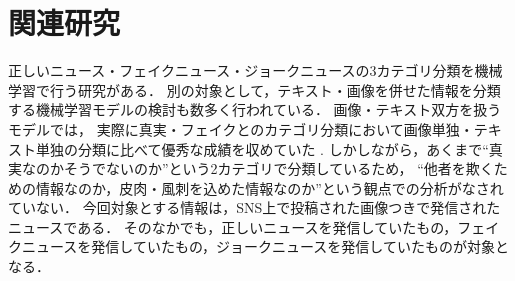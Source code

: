 \section{関連研究}\label{ch:related}
正しいニュース・フェイクニュース・ジョークニュースの3カテゴリ分類を機械学習で行う研究がある\cite{DBLP:journals/corr/HorneA17}．
別の対象として，テキスト・画像を併せた情報を分類する機械学習モデルの検討も数多く行われている\cite{Wang:2018:EEA:3219819.3219903}．
画像・テキスト双方を扱うモデルでは，
実際に真実・フェイクとのカテゴリ分類において画像単独・テキスト単独の分類に比べて優秀な成績を収めていた
\cite{Wang:2018:EEA:3219819.3219903}.
しかしながら，あくまで``真実なのかそうでないのか''という2カテゴリで分類しているため，
``他者を欺くための情報なのか，皮肉・風刺を込めた情報なのか''という観点での分析がなされていない．
今回対象とする情報は，SNS上で投稿された画像つきで発信されたニュースである．
そのなかでも，正しいニュースを発信していたもの，フェイクニュースを発信していたもの，ジョークニュースを発信していたものが対象となる．
